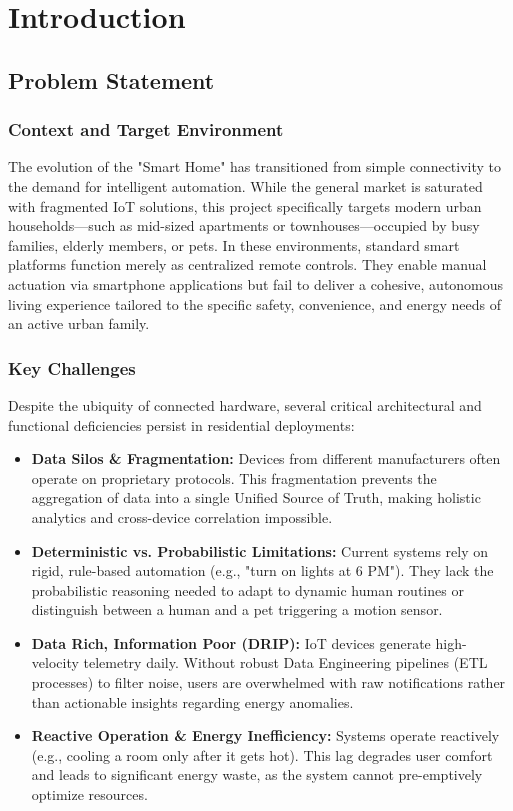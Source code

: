 \newpage

\section{Introduction}

\subsection{Problem Statement}

\subsubsection*{Context and Target Environment}
The evolution of the "Smart Home" has transitioned from simple connectivity to the demand for intelligent automation. While the general market is saturated with fragmented IoT solutions, this project specifically targets modern urban households—such as mid-sized apartments or townhouses—occupied by busy families, elderly members, or pets. In these environments, standard smart platforms function merely as centralized remote controls. They enable manual actuation via smartphone applications but fail to deliver a cohesive, autonomous living experience tailored to the specific safety, convenience, and energy needs of an active urban family.

\subsubsection*{Key Challenges}
Despite the ubiquity of connected hardware, several critical architectural and functional deficiencies persist in residential deployments:

\begin{itemize}
    \item \textbf{Data Silos \& Fragmentation:} Devices from different manufacturers often operate on proprietary protocols. This fragmentation prevents the aggregation of data into a single Unified Source of Truth, making holistic analytics and cross-device correlation impossible.\cite{nxp_matter_standard_2021}
    \item \textbf{Deterministic vs. Probabilistic Limitations:} Current systems rely on rigid, rule-based automation (e.g., "turn on lights at 6 PM"). They lack the probabilistic reasoning needed to adapt to dynamic human routines or distinguish between a human and a pet triggering a motion sensor.
    \item \textbf{Data Rich, Information Poor (DRIP):} IoT devices generate high-velocity telemetry daily. Without robust Data Engineering pipelines (ETL processes) to filter noise, users are overwhelmed with raw notifications rather than actionable insights regarding energy anomalies.
    \item \textbf{Reactive Operation \& Energy Inefficiency:} Systems operate reactively (e.g., cooling a room only after it gets hot). This lag degrades user comfort and leads to significant energy waste, as the system cannot pre-emptively optimize resources.
\end{itemize}

